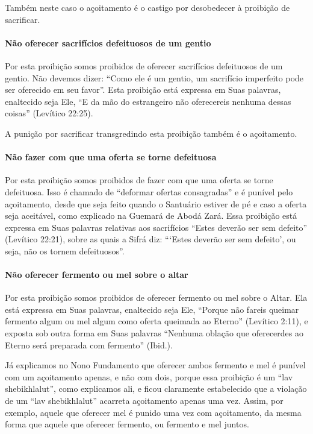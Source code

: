 Também neste caso o açoitamento é o castigo por desobedecer à proibição
de sacrificar.


\paragraph{Não oferecer sacrifícios defeituosos de um gentio}

Por esta proibição somos proibidos de oferecer sacrifícios defeituosos
de um gentio. Não devemos dizer: ``Como ele é um gentio, um sacrifício
imperfeito pode ser oferecido em seu favor''. Esta proibição está
expressa em Suas palavras, enaltecido seja Ele, ``E da mão do
estrangeiro não oferecereis nenhuma dessas coisas'' (Levítico 22:25).

A punição por sacrificar transgredindo esta proibição também é o
açoitamento.

\paragraph{Não fazer com que uma oferta se torne defeituosa}

Por esta proibição somos proibidos de fazer com que uma oferta se torne
defeituosa. Isso é chamado de ``deformar ofertas consagradas'' e é
punível pelo açoitamento, desde que seja feito quando o Santuário
estiver de pé e caso a oferta seja aceitável, como explicado na Guemará
de Abodá Zará. Essa proibição está expressa em Suas palavras relativas
aos sacrifícios ``Estes deverão ser sem defeito'' (Levítico 22:21),
sobre as quais a Sifrá diz: ```Estes deverão ser sem defeito', ou seja,
não os tornem defeituosos''.

\paragraph{Não oferecer fermento ou mel sobre o altar}

Por esta proibição somos proibidos de oferecer fermento ou mel sobre o
Altar. Ela está expressa em Suas palavras, enaltecido seja Ele, ``Porque
não fareis queimar fermento algum ou mel algum como oferta queimada ao
Eterno'' (Levítico 2:11), e exposta sob outra forma em Suas palavras
``Nenhuma oblação que oferecerdes ao Eterno será preparada com
fermento'' (Ibid.).

Já explicamos no Nono Fundamento que oferecer ambos fermento e mel é
punível com um açoitamento apenas, e não com dois, porque essa
proibição é um ``lav shebikhlalut'', como explicamos ali, e ficou
claramente estabelecido que a violação de um ``lav shebikhlalut''
acarreta açoitamento apenas uma vez. Assim, por exemplo, aquele que
oferecer mel é punido uma vez com açoitamento, da mesma forma que aquele
que oferecer fermento, ou fermento e mel juntos.

